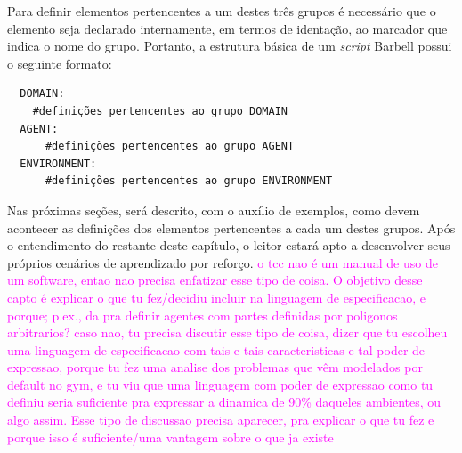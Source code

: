 \documentclass[cic,tc]{iiufrgs}
\newcommand\bruno[1]{\textcolor{magenta}{#1}}
\begin{document}
Para definir elementos pertencentes a um destes três grupos é necessário que o elemento seja declarado internamente,
em termos de identação, ao marcador que indica o nome do grupo. Portanto, a estrutura básica de um \textit{script} Barbell possui o seguinte formato:

  \begin{verbatim}
  DOMAIN:
    #definições pertencentes ao grupo DOMAIN
  AGENT:
      #definições pertencentes ao grupo AGENT
  ENVIRONMENT:
      #definições pertencentes ao grupo ENVIRONMENT
  \end{verbatim}

Nas próximas seções, será descrito, com o auxílio de exemplos, como devem acontecer as definições dos elementos pertencentes a cada um destes grupos. Após o entendimento
do restante deste capítulo, o leitor estará apto a desenvolver seus próprios cenários de aprendizado por reforço. \bruno{o tcc nao é um manual de uso de um software, entao nao precisa enfatizar esse tipo de coisa. O objetivo desse capto é explicar o que tu fez/decidiu incluir na linguagem de especificacao, e porque; p.ex., da pra definir agentes com partes definidas por poligonos arbitrarios? caso nao, tu precisa discutir esse tipo de coisa, dizer que tu escolheu uma linguagem de especificacao com tais e tais caracteristicas e tal poder de expressao, porque tu fez uma analise dos problemas que vêm modelados por default no gym, e tu viu que uma linguagem com poder de expressao como tu definiu seria suficiente pra expressar a dinamica de 90\% daqueles ambientes, ou algo assim. Esse tipo de discussao precisa aparecer, pra explicar o que tu fez e porque isso é suficiente/uma vantagem sobre o que ja existe}
\end{document}
